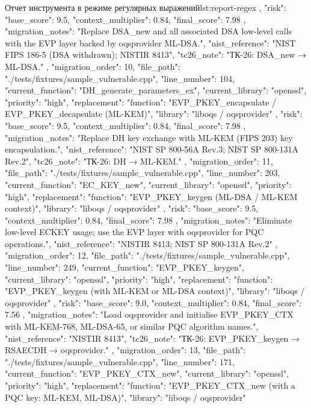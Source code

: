 \documentclass{itmo-vkr}
\begin{document}
\begin{itmolisting}[JSON]{Отчет инструмента в режиме регулярных выражений}{lst:report-regex}
{{{			},
			"risk": {
				"base_score": 9.5,
				"context_multiplier": 0.84,
				"final_score": 7.98
			},
			"migration_notes": "Replace DSA_new and all associated DSA low-level calls with the EVP layer backed by oqsprovider ML-DSA.",
			"nist_reference": "NIST FIPS 186-5 (DSA withdrawn); NISTIR 8413",
			"tc26_note": "ТК-26: DSA_new → ML-DSA."
		},
		{
			"migration_order": 10,
			"file_path": "./tests/fixtures/sample_vulnerable.cpp",
			"line_number": 104,
			"current_function": "DH_generate_parameters_ex",
			"current_library": "openssl",
			"priority": "high",
			"replacement": {
				"function": "EVP_PKEY_encapsulate / EVP_PKEY_decapsulate (ML-KEM)",
				"library": "liboqs / oqsprovider"
			},
			"risk": {
				"base_score": 9.5,
				"context_multiplier": 0.84,
				"final_score": 7.98
			},
			"migration_notes": "Replace DH key exchange with ML-KEM (FIPS 203) key encapsulation.",
			"nist_reference": "NIST SP 800-56A Rev.3; NIST SP 800-131A Rev.2",
			"tc26_note": "ТК-26: DH → ML-KEM."
		},
		{
			"migration_order": 11,
			"file_path": "./tests/fixtures/sample_vulnerable.cpp",
			"line_number": 203,
			"current_function": "EC_KEY_new",
			"current_library": "openssl",
			"priority": "high",
			"replacement": {
				"function": "EVP_PKEY_keygen (ML-DSA / ML-KEM context)",
				"library": "liboqs / oqsprovider"
			},
			"risk": {
				"base_score": 9.5,
				"context_multiplier": 0.84,
				"final_score": 7.98
			},
			"migration_notes": "Eliminate low-level ECKEY usage; use the EVP layer with oqsprovider for PQC operations.",
			"nist_reference": "NISTIR 8413; NIST SP 800-131A Rev.2"
		},
		{
			"migration_order": 12,
			"file_path": "./tests/fixtures/sample_vulnerable.cpp",
			"line_number": 249,
			"current_function": "EVP_PKEY_keygen",
			"current_library": "openssl",
			"priority": "high",
			"replacement": {
				"function": "EVP_PKEY_keygen (with ML-KEM or ML-DSA context)",
				"library": "liboqs / oqsprovider"
			},
			"risk": {
				"base_score": 9.0,
				"context_multiplier": 0.84,
				"final_score": 7.56
			},
			"migration_notes": "Load oqsprovider and initialise EVP_PKEY_CTX with ML-KEM-768, ML-DSA-65, or similar PQC algorithm names.",
			"nist_reference": "NISTIR 8413",
			"tc26_note": "ТК-26: EVP_PKEY_keygen → RSAECDH → oqsprovider."
		},
		{
			"migration_order": 13,
			"file_path": "./tests/fixtures/sample_vulnerable.cpp",
			"line_number": 171,
			"current_function": "EVP_PKEY_CTX_new",
			"current_library": "openssl",
			"priority": "high",
			"replacement": {
				"function": "EVP_PKEY_CTX_new (with a PQC key: ML-KEM, ML-DSA)",
				"library": "liboqs / oqsprovider"
}}}
\end{itmolisting}
\end{document}
